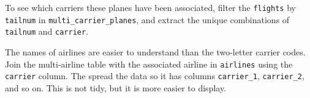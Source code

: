 \documentclass[]{book}
\newenvironment{Shaded}{\begin{snugshade}}{\end{snugshade}}
\newcommand{\CommentTok}[1]{\textcolor[rgb]{0.56,0.35,0.01}{\textit{#1}}}
\newcommand{\DataTypeTok}[1]{\textcolor[rgb]{0.13,0.29,0.53}{#1}}
\newcommand{\KeywordTok}[1]{\textcolor[rgb]{0.13,0.29,0.53}{\textbf{#1}}}
\newcommand{\NormalTok}[1]{#1}
\newcommand{\OperatorTok}[1]{\textcolor[rgb]{0.81,0.36,0.00}{\textbf{#1}}}
\newcommand{\StringTok}[1]{\textcolor[rgb]{0.31,0.60,0.02}{#1}}
\theoremstyle{plain}
\theoremstyle{remark}
\theoremstyle{definition}
\theoremstyle{definition}
\theoremstyle{definition}
\theoremstyle{remark}
\begin{document}
To see which carriers these planes have been associated, filter the
\texttt{flights} by \texttt{tailnum} in \texttt{multi\_carrier\_planes},
and extract the unique combinations of \texttt{tailnum} and
\texttt{carrier}.

\begin{Shaded}
\end{Shaded}

The names of airlines are easier to understand than the two-letter
carrier codes. Join the multi-airline table with the associated airline
in \texttt{airlines} using the \texttt{carrier} column. The spread the
data so it has columns \texttt{carrier\_1}, \texttt{carrier\_2}, and so
on. This is not tidy, but it is more easier to display.
\end{document}
